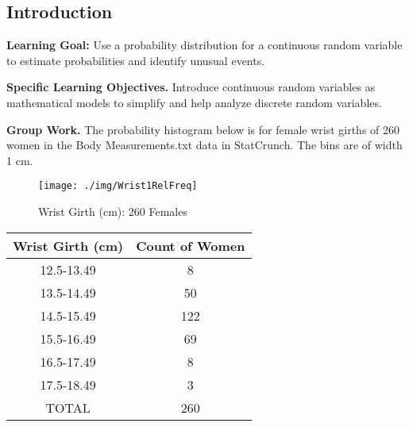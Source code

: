 \subsection{Introduction}
\textbf{Learning Goal:} Use a probability distribution for a continuous random variable to estimate probabilities and identify unusual events.

\textbf{Specific Learning Objectives.} Introduce continuous random variables as mathematical models to simplify and help analyze discrete random variables.

\textbf{Group Work.} The probability histogram below is for female wrist girths of 260 women in the Body Measurements.txt data in StatCrunch. The bins are of width 1 cm.

\begin{figure}[h]
\centering{}\texttt{[image: ./img/Wrist1RelFreq]} \caption{Wrist Girth (cm): 260 Females}
\end{figure}

\begin{table}[H]\centering
\begin{tabular}{|c|c|}
\hline
Wrist Girth (cm)&Count of Women\\
\hline
12.5-13.49&8\\
\hline
13.5-14.49&50\\
\hline
14.5-15.49&122\\
\hline
15.5-16.49&69\\
\hline
16.5-17.49&8\\
\hline
17.5-18.49&3\\
\hline
TOTAL&260\\
\hline
\end{tabular}
\end{table}

